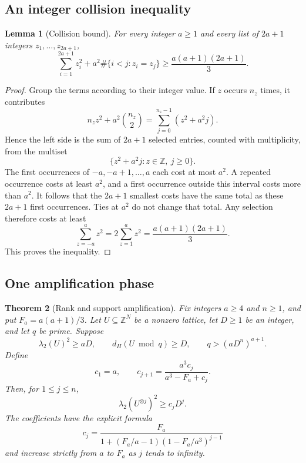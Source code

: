 \documentclass[11pt,letterpaper]{article}
\numberwithin{equation}{section}
\newtheorem{theorem}{Theorem}[section]
\newtheorem{lemma}[theorem]{Lemma}
\theoremstyle{definition}
\theoremstyle{remark}
\newcommand{\Z}{\mathbb Z}
\begin{document}
\subsection{An integer collision inequality}
\begin{lemma}[Collision bound]\label{lem:collision}
For every integer $a\ge1$ and every list of $2a+1$ integers $z_1,\ldots,z_{2a+1}$,
\begin{equation}\label{eq:collision}
 \sum_{i=1}^{2a+1}z_i^2
 +a^2\#\{i<j:z_i=z_j\}
 \ge\frac{a(a+1)(2a+1)}3.
\end{equation}
\end{lemma}
\begin{proof}
Group the terms according to their integer value. If $z$ occurs $n_z$ times, it contributes
\[
 n_zz^2+a^2\binom{n_z}{2}
 =\sum_{j=0}^{n_z-1}(z^2+a^2j).
\]
Hence the left side is the sum of $2a+1$ selected entries, counted with multiplicity, from the multiset
\[
 \{z^2+a^2j:z\in\Z,\ j\ge0\}.
\]
The first occurrences of $-a,-a+1,\ldots,a$ each cost at most $a^2$. A repeated occurrence costs at least $a^2$, and a first occurrence outside this interval costs more than $a^2$. It follows that the $2a+1$ smallest costs have the same total as these $2a+1$ first occurrences. Ties at $a^2$ do not change that total. Any selection therefore costs at least
\[
 \sum_{z=-a}^{a}z^2
 =2\sum_{z=1}^{a}z^2
 =\frac{a(a+1)(2a+1)}3.
\]
This proves the inequality.
\end{proof}

\subsection{One amplification phase}
\begin{samepage}
\begin{theorem}[Rank and support amplification]\label{thm:phase}
Fix integers $a\ge4$ and $n\ge1$, and put $F_a=a(a+1)/3$. Let $U\subseteq\Z^N$ be a nonzero lattice, let $D\ge1$ be an integer, and let $q$ be prime. Suppose
\begin{equation}\label{eq:phase-hypotheses}
 \lambda_2(U)^2\ge aD,
 \qquad d_H(U\bmod q)\ge D,
 \qquad q>(aD^n)^{a+1}.
\end{equation}
Define
\begin{equation}\label{eq:recurrence}
 c_1=a,\qquad c_{j+1}=\frac{a^3c_j}{a^3-F_a+c_j}.
\end{equation}
Then, for $1\le j\le n$,
\begin{equation}\label{eq:phase-conclusion}
 \lambda_2(U^{\otimes j})^2\ge c_jD^j.
\end{equation}
The coefficients have the explicit formula
\begin{equation}\label{eq:closed-form}
 c_j=\frac{F_a}{1+(F_a/a-1)(1-F_a/a^3)^{j-1}}
\end{equation}
and increase strictly from $a$ to $F_a$ as $j$ tends to infinity.
\end{theorem}
\end{samepage}
\end{document}
